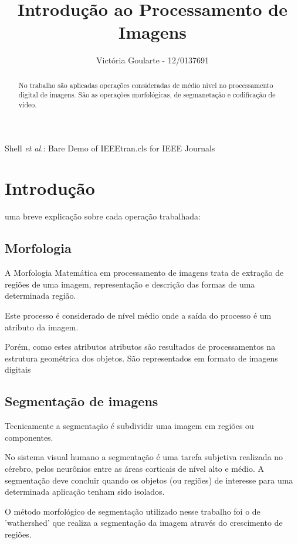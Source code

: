 \documentclass[journal]{IEEEtran}
\begin{document}
\title{Introdução ao Processamento de Imagens}

\author{Victória Goularte - 12/0137691}

{Shell \MakeLowercase{\textit{et al.}}: Bare Demo of IEEEtran.cls for IEEE Journals}

\maketitle

\begin{abstract}
No trabalho são aplicadas operações consideradas de médio nível no processamento digital de imagens. São as operações morfológicas, de segmanetação e codificação de vídeo.
\end{abstract}

\section{Introdução}

 uma breve explicação sobre cada operação trabalhada:

\subsection{Morfologia}
A Morfologia Matemática em processamento de imagens trata de  extração de regiões de uma imagem, representação e descrição das formas de uma determinada região.

Este processo é considerado de nível médio onde a saída do
processo é um atributo da imagem.

Porém, como estes atributos atributos são resultados de processamentos na estrutura geométrica dos objetos. São representados em formato de imagens digitais

\subsection{Segmentação de imagens}
Tecnicamente a segmentação é subdividir uma
imagem em regiões ou componentes.

No sistema visual humano a segmentação é uma
tarefa subjetiva realizada no cérebro, pelos
neurônios entre as áreas corticais de nível alto
e médio.
A segmentação deve concluir quando os objetos
(ou regiões) de interesse para uma
determinada aplicação tenham sido isolados.

O método morfológico de segmentação utilizado nesse trabalho foi o de 'wathershed' que realiza a segmentação da imagem através do crescimento de regiões.
\end{document}
